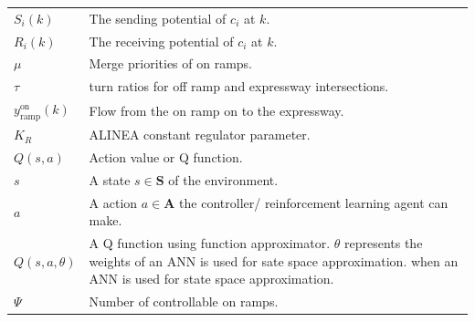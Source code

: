 \documentclass{sig-alternate-05-2015}
\begin{document}
\begin{table}[!h]
{\begin{tabular}{p{1.5cm}p{6cm}}
		$S_i(k)$                         & The sending potential of $c_i$ at $k$.                                                                                                                                                                    \\
		$R_i(k)$                         & The receiving potential of $c_i$ at  $k$.                                                                                                                                                                  \\
		$\mu$                            & Merge priorities of on ramps.                                                                                                                                                                                              \\
		$\tau$                           & turn ratios for off ramp and expressway intersections.                                                                                                                                                                     \\
		$y^{\text{on}}_{\text{ramp}}(k)$ & Flow from the on ramp on to the expressway.                                                                                                                                                                                \\
		$K_R$                            & ALINEA constant regulator parameter.                                                                                                                                                                                       \\
		$Q(s,a)$                         & Action value or Q function.                                                                                                                                                                                                \\
		$s$                              & A state $s \in \mathbf{S}$ of the environment.                                                                                                                                                                             \\
		$a$                              & A action $a \in \mathbf{A}$ the controller/ reinforcement learning  agent  can make.                                                                                        \\
		$Q(s,a,\theta)$                  & A Q function using function approximator. $\theta$ represents the weights  of an ANN is used for sate space approximation. when an ANN is used for state space approximation. \\
		$\Psi$                           & Number of controllable on ramps.                                                                                                                                                                     \\ \bottomrule
	\end{tabular}}
\end{table}
\end{document}
